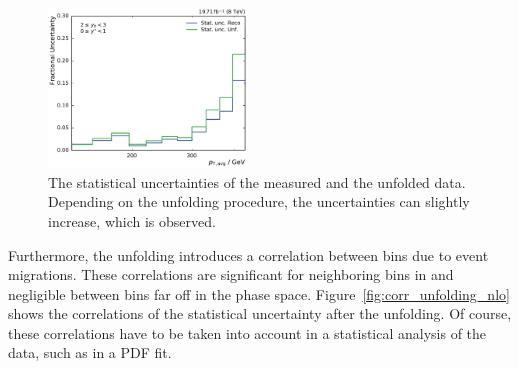 \begin{figure}[htbp]
    \includegraphics[width=0.47\textwidth]{figures/measurement/statunc_fractional_yb2ys0.pdf}
    \caption[Statistical uncertainty of measured and unfolded spectrum]{The
    statistical uncertainties of the measured and the unfolded data. Depending
    on the unfolding procedure, the uncertainties can slightly increase, which
    is observed.}
    \label{fig:statunc_relative}
\end{figure}

Furthermore, the unfolding introduces a correlation between bins due to event
migrations. These correlations are significant for neighboring bins in \pt and
negligible between bins far off in the phase space.
Figure~\ref{fig:corr_unfolding_nlo} shows the correlations of the statistical
uncertainty after the unfolding. Of course, these correlations have to be taken
into account in a statistical analysis of the data, such as in a PDF fit.

